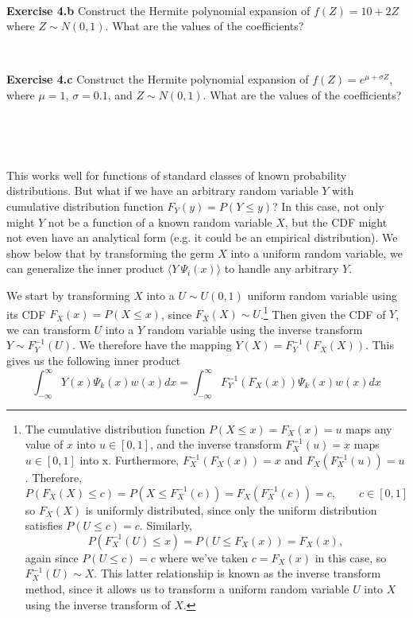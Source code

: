 \documentclass[11pt]{article}
\numberwithin{equation}{section}
\begin{document}
\

\textbf{Exercise 4.b} Construct the Hermite polynomial expansion of $f(Z) = 10 + 2Z$ where $Z \sim N(0,1)$. What are the values of the coefficients?

\

\textbf{Exercise 4.c} Construct the Hermite polynomial expansion of $f(Z) = e^{\mu + \sigma Z}$, where $\mu = 1$, $\sigma = 0.1$, and $Z \sim N(0,1)$. What are the values of the coefficients?

\

\




This works well for functions of standard classes of known probability distributions. But what if we have an arbitrary random variable $Y$ with cumulative distribution function $F_Y(y) = P(Y \leq y)$? In this case, not only might $Y$ not be a function of a known random variable $X$, but the CDF might not even have an analytical form (e.g. it could be an empirical distribution). We show below that by transforming the germ $X$ into a uniform random variable, we can generalize the inner product $\langle Y \ \Psi_i(x) \rangle$ to handle any arbitrary $Y$.

\qquad We start by transforming $X$ into a $U \sim U(0,1)$ uniform random variable using its CDF $F_X(x) = P(X \leq x)$, since $F_X(X) \sim U$.\footnote{The cumulative distribution function $P(X \leq x) = F_X(x) = u$ maps any value of $x$ into $u \in [0, 1]$, and the inverse transform $F_X^{-1}(u) = x$ maps $u \in [0, 1]$ into x. Furthermore, $F_X^{-1}(F_X(x)) = x$ and $F_X(F_X^{-1}(u)) = u$. Therefore, 
\begin{equation*}
P(F_X(X) \leq c) = P(X \leq F_X^{-1}(c)) = F_X(F_X^{-1}(c)) = c, \qquad c \in [0, 1]
\end{equation*}
so $F_X(X)$ is uniformly distributed, since only the uniform distribution satisfies $P(U \leq c) = c$. Similarly,
\begin{equation*}
P(F_X^{-1}(U) \leq x) = P(U \leq F_X(x)) = F_X(x),
\end{equation*}
again since $P(U \leq c) = c$ where we've taken $c = F_X(x)$ in this case, so $F_X^{-1}(U) \sim X$. This latter relationship is known as the inverse transform method, since it allows us to transform a uniform random variable $U$ into $X$ using the inverse transform of $X$.}
Then given the CDF of $Y$, we can transform $U$ into a $Y$ random variable using the inverse transform $Y \sim F_Y^{-1}(U)$. We therefore have the mapping $Y(X) = F_Y^{-1} (F_X(X))$. This gives us the following inner product
\begin{equation}
\int_{-\infty}^{\infty} Y(x) \Psi_k(x) w(x) dx = \int_{-\infty}^{\infty} F_Y^{-1} (F_X(x)) \Psi_k(x) w(x) dx \label{ip_arb}
\end{equation}
\end{document}
